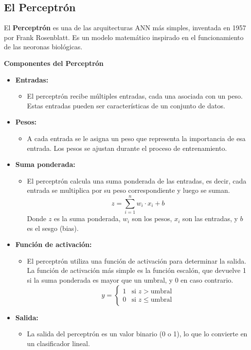 \documentclass[12pt]{article}
\begin{document}
  \subsection{El Perceptrón}
  El \textbf{Perceptrón}   es una de las arquitecturas ANN más simples, inventada en 1957 por Frank Rosenblatt. 
  Es un modelo matemático inspirado en el funcionamiento de las neoronas biológicas.
  
  \textbf{Componentes del Perceptrón}

  \begin{itemize}
      \item \textbf{Entradas:}
      \begin{itemize}
          \item El perceptrón recibe múltiples entradas, cada una asociada con un peso. Estas entradas pueden ser características de un conjunto de datos.
      \end{itemize}
      
      \item \textbf{Pesos:}
      \begin{itemize}
          \item A cada entrada se le asigna un peso que representa la importancia de esa entrada. Los pesos se ajustan durante el proceso de entrenamiento.
      \end{itemize}
      
      \item \textbf{Suma ponderada:}
      \begin{itemize}
          \item El perceptrón calcula una suma ponderada de las entradas, es decir, cada entrada se multiplica por su peso correspondiente y luego se suman.
          \[
          z = \sum_{i=1}^{n} w_i \cdot x_i + b
          \]
          Donde \( z \) es la suma ponderada, \( w_i \) son los pesos, \( x_i \) son las entradas, y \( b \) es el sesgo (bias).
      \end{itemize}
    
    \item \textbf{Función de activación:}
    \begin{itemize}
        \item El perceptrón utiliza una función de activación para determinar la salida. La función de activación más simple es la función escalón, que devuelve 1 si la suma ponderada es mayor que un umbral, y 0 en caso contrario.
        \[
        y = 
        \begin{cases} 
        1 & \text{si } z > \text{umbral} \\
        0 & \text{si } z \leq \text{umbral}
        \end{cases}
        \]
    \end{itemize}
    
    \item \textbf{Salida:}
    \begin{itemize}
        \item La salida del perceptrón es un valor binario (0 o 1), lo que lo convierte en un clasificador lineal.
    \end{itemize}
\end{itemize}
  
\end{document}
